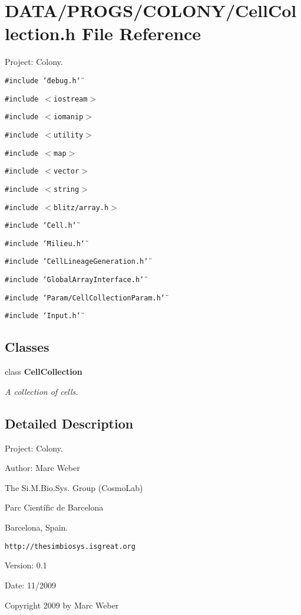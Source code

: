 \section{DATA/PROGS/COLONY/CellCollection.h File Reference}
\label{CellCollection_8h}
Project: Colony. 

{\tt \#include \char`\"{}debug.h\char`\"{}}\par
{\tt \#include $<$iostream$>$}\par
{\tt \#include $<$iomanip$>$}\par
{\tt \#include $<$utility$>$}\par
{\tt \#include $<$map$>$}\par
{\tt \#include $<$vector$>$}\par
{\tt \#include $<$string$>$}\par
{\tt \#include $<$blitz/array.h$>$}\par
{\tt \#include \char`\"{}Cell.h\char`\"{}}\par
{\tt \#include \char`\"{}Milieu.h\char`\"{}}\par
{\tt \#include \char`\"{}CellLineageGeneration.h\char`\"{}}\par
{\tt \#include \char`\"{}GlobalArrayInterface.h\char`\"{}}\par
{\tt \#include \char`\"{}Param/CellCollectionParam.h\char`\"{}}\par
{\tt \#include \char`\"{}Input.h\char`\"{}}\par
\subsection*{Classes}
\begin{CompactItemize}
\item 
class {\bf CellCollection}
\begin{CompactList}\small\item\em A collection of cells. \item\end{CompactList}\end{CompactItemize}


\subsection{Detailed Description}
Project: Colony. 

\begin{Desc}
\item[Author:]Marc Weber\par
 The Si.M.Bio.Sys. Group (CosmoLab)\par
 Parc Científic de Barcelona\par
 Barcelona, Spain.\par
 {\tt http://thesimbiosys.isgreat.org} \end{Desc}
\begin{Desc}
\item[Version:]0.1 \end{Desc}
\begin{Desc}
\item[Date:]11/2009\end{Desc}
Copyright 2009 by Marc Weber 